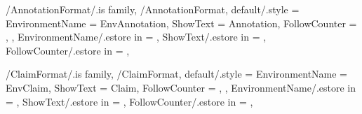 \newcommand{\InsertNote}[1]
{%
  \InsertTheoremContent[\empty]{\GetNoteFormatEnvironmentName}{#1}%
} %

\newcommand{\InitNoteFormat}
{%
  \ifthenelse{\equal{\GetNoteFormatFollowCounter}{\empty}}
  {%
    \newtheorem*{%
      \GetNoteFormatEnvironmentName}{\GetNoteFormatShowText}
  }%
  {%
    \newtheorem{%
      \GetNoteFormatEnvironmentName}{%
      \GetNoteFormatShowText}[\GetNoteFormatFollowCounter]%
  }%
} %


\pgfkeys
{
  /AnnotationFormat/.is family, /AnnotationFormat,
  default/.style =
  {
    EnvironmentName = {EnvAnnotation},
    ShowText = {Annotation},
    FollowCounter = \empty,
  },
  EnvironmentName/.estore in = \GetAnnotationFormatEnvironmentName,
  ShowText/.estore in = \GetAnnotationFormatShowText,
  FollowCounter/.estore in = \GetAnnotationFormatFollowCounter,
} %

\newcommand{\InsertAnnotation}[1]
{%
  \InsertTheoremContent[\empty]{\GetAnnotationFormatEnvironmentName}{#1}%
} %

\newcommand{\InitAnnotationFormat}
{%
  \ifthenelse{\equal{\GetAnnotationFormatFollowCounter}{\empty}}
  {%
    \newtheorem*{%
      \GetAnnotationFormatEnvironmentName}{\GetAnnotationFormatShowText}
  }%
  {%
    \newtheorem{%
      \GetAnnotationFormatEnvironmentName}{%
      \GetAnnotationFormatShowText}[\GetAnnotationFormatFollowCounter]%
  }%
} %


\pgfkeys
{
  /ClaimFormat/.is family, /ClaimFormat,
  default/.style =
  {
    EnvironmentName = {EnvClaim},
    ShowText = {Claim},
    FollowCounter = \empty,
  },
  EnvironmentName/.estore in = \GetClaimFormatEnvironmentName,
  ShowText/.estore in = \GetClaimFormatShowText,
  FollowCounter/.estore in = \GetClaimFormatFollowCounter,
} %

\newcommand{\InsertClaim}[1]
{%
  \InsertTheoremContent[\empty]{\GetClaimFormatEnvironmentName}{#1}%
} %

\newcommand{\InitClaimFormat}
{%
  \ifthenelse{\equal{\GetClaimFormatFollowCounter}{\empty}}
  {%
    \newtheorem*{%
      \GetClaimFormatEnvironmentName}{\GetClaimFormatShowText}
  }%
  {%
    \newtheorem{%
      \GetClaimFormatEnvironmentName}{%
      \GetClaimFormatShowText}[\GetClaimFormatFollowCounter]%
  }%
} %

